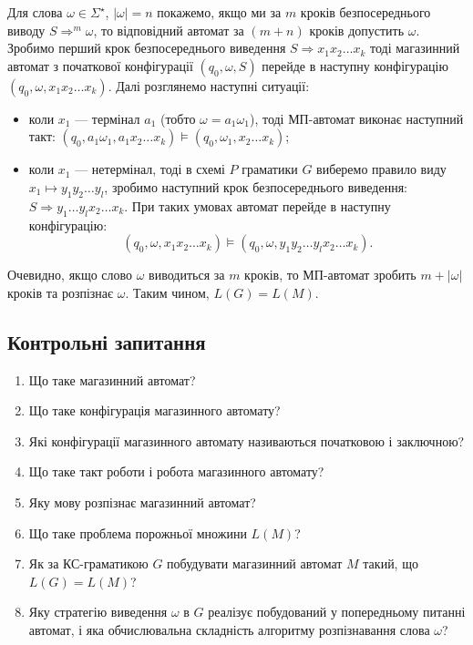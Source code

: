 Для слова $\omega \in \Sigma^\star$, $|\omega| = n$ покажемо, якщо ми за $m$ кроків 
безпосереднього виводу $S \Rightarrow^m \omega$, то відповідний автомат за $(m + n)$ кроків допустить $\omega$. Зробимо перший крок безпосереднього виведення $S \Rightarrow x_1 x_2 \ldots x_k$ тоді магазинний автомат з початкової конфігурації $(q_0, \omega, S)$ перейде в наступну конфігурацію $(q_0, \omega, x_1 x_2 \ldots x_k)$. Далі розглянемо наступні ситуації:
\begin{itemize}
	\item коли $x_1$ --- термінал $a_1$ (тобто $\omega = a_1 \omega_1$), тоді МП-автомат виконає наступний такт: $(q_0, a_1 \omega_1, a_1 x_2 \ldots x_k) \models (q_0, \omega_1, x_2 \ldots x_k)$;
	\item коли $x_1$ --- нетермінал, тоді в схемі $P$ граматики $G$ виберемо правило виду $x_1 \mapsto y_1 y_2 \ldots y_l$, зробимо наступний крок безпосереднього виведення: $S \Rightarrow y_1 \ldots y_l x_2 \ldots x_k$. При таких умовах автомат перейде в наступну конфігурацію:
	\begin{equation}
		(q_0, \omega, x_1 x_2 \ldots x_k) \models (q_0, \omega, y_1 y_2 \ldots y_l x_2 \ldots x_k).
	\end{equation}
\end{itemize}

Очевидно, якщо слово $\omega$ виводиться за $m$ кроків, то МП-автомат зробить $m + |\omega|$ кроків та розпізнає $\omega$. Таким чином, $L(G) = L(M)$.

\subsection{Контрольні запитання}

\begin{enumerate}
	\item Що таке магазинний автомат? %
	\item Що таке конфігурація магазинного автомату? %
	\item Які конфігурації магазинного автомату називаються початковою і заключною? %
	\item Що таке такт роботи і робота магазинного автомату? %
	\item Яку мову розпізнає магазинний автомат? %
	\item Що таке проблема порожньої множини $L(M)$? %
	\item Як за КС-граматикою $G$ побудувати магазинний автомат $M$ такий, що $L(G) = L(M)$?
	\item Яку стратегію виведення $\omega$ в $G$ реалізує побудований у попередньому питанні автомат, і яка обчислювальна складність алгоритму розпізнавання слова $\omega$? %
\end{enumerate}